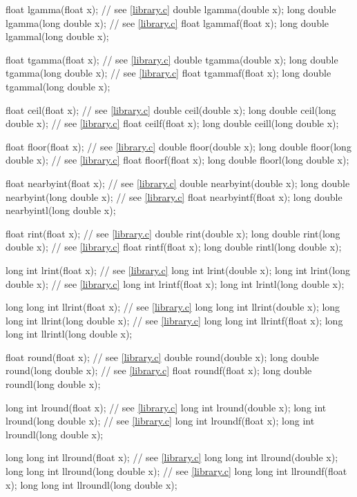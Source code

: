 \begin{codeblock}
{  float lgamma(float x);                // see \ref{library.c}
  double lgamma(double x);
  long double lgamma(long double x);    // see \ref{library.c}
  float lgammaf(float x);
  long double lgammal(long double x);

  float tgamma(float x);                // see \ref{library.c}
  double tgamma(double x);
  long double tgamma(long double x);    // see \ref{library.c}
  float tgammaf(float x);
  long double tgammal(long double x);

  float ceil(float x);                  // see \ref{library.c}
  double ceil(double x);
  long double ceil(long double x);      // see \ref{library.c}
  float ceilf(float x);
  long double ceill(long double x);

  float floor(float x);                 // see \ref{library.c}
  double floor(double x);
  long double floor(long double x);     // see \ref{library.c}
  float floorf(float x);
  long double floorl(long double x);

  float nearbyint(float x);             // see \ref{library.c}
  double nearbyint(double x);
  long double nearbyint(long double x); // see \ref{library.c}
  float nearbyintf(float x);
  long double nearbyintl(long double x);

  float rint(float x);                  // see \ref{library.c}
  double rint(double x);
  long double rint(long double x);      // see \ref{library.c}
  float rintf(float x);
  long double rintl(long double x);

  long int lrint(float x);              // see \ref{library.c}
  long int lrint(double x);
  long int lrint(long double x);        // see \ref{library.c}
  long int lrintf(float x);
  long int lrintl(long double x);

  long long int llrint(float x);        // see \ref{library.c}
  long long int llrint(double x);
  long long int llrint(long double x);  // see \ref{library.c}
  long long int llrintf(float x);
  long long int llrintl(long double x);

  float round(float x);                 // see \ref{library.c}
  double round(double x);
  long double round(long double x);     // see \ref{library.c}
  float roundf(float x);
  long double roundl(long double x);

  long int lround(float x);             // see \ref{library.c}
  long int lround(double x);
  long int lround(long double x);       // see \ref{library.c}
  long int lroundf(float x);
  long int lroundl(long double x);

  long long int llround(float x);       // see \ref{library.c}
  long long int llround(double x);
  long long int llround(long double x); // see \ref{library.c}
  long long int llroundf(float x);
  long long int llroundl(long double x);

}
\end{codeblock}

